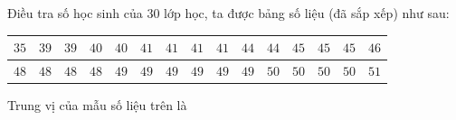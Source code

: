 \begin{ex}
Điều tra số học sinh của $30$ lớp học, ta được bảng số liệu (đã sắp xếp) như sau:
\begin{center}
\begin{tabular}{|c|c|c|c|c|c|c|c|c|c|c|c|c|c|c|}\hline
$35$ & $39$ & $39$ & $40$ & $40$ & $41$ & $41$ & $41$ & $41$ & $44$ & $44$ & $45$ & $45$ & $45$ & $46$\\\hline
$48$ & $48$ & $48$ & $48$ & $49$ & $49$ & $49$ & $49$ & $49$ & $49$ & $50$ & $50$ & $50$ & $50$ & $51$\\\hline
\end{tabular}
\end{center}
Trung vị của mẫu số liệu trên là
\end{ex}
